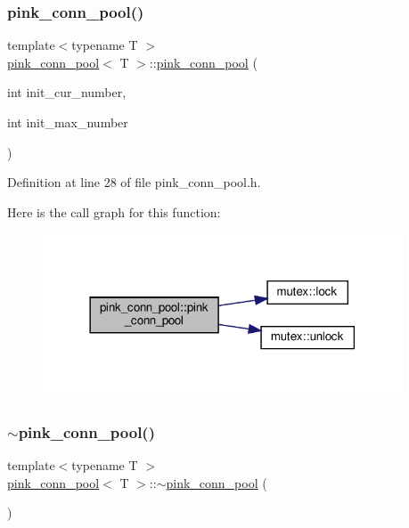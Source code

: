 \subsubsection{\texorpdfstring{pink\+\_\+conn\+\_\+pool()}{pink\_conn\_pool()}}
{\footnotesize\ttfamily template$<$typename T $>$ \\
\hyperlink{classpink__conn__pool}{pink\+\_\+conn\+\_\+pool}$<$ T $>$\+::\hyperlink{classpink__conn__pool}{pink\+\_\+conn\+\_\+pool} (\begin{DoxyParamCaption}\item[{int}]{init\+\_\+cur\+\_\+number,  }\item[{int}]{init\+\_\+max\+\_\+number }\end{DoxyParamCaption})}



Definition at line 28 of file pink\+\_\+conn\+\_\+pool.\+h.

Here is the call graph for this function\+:\nopagebreak
\begin{figure}[H]
\begin{center}
\leavevmode
\includegraphics[width=302pt]{classpink__conn__pool_a5c557c48815d595f7897f6abc8e55758_cgraph}
\end{center}
\end{figure}
\mbox{\label{classpink__conn__pool_a292bf2f0711edeee62ee787eb72b9311}} 
\subsubsection{\texorpdfstring{$\sim$pink\+\_\+conn\+\_\+pool()}{~pink\_conn\_pool()}}
{\footnotesize\ttfamily template$<$typename T $>$ \\
\hyperlink{classpink__conn__pool}{pink\+\_\+conn\+\_\+pool}$<$ T $>$\+::$\sim$\hyperlink{classpink__conn__pool}{pink\+\_\+conn\+\_\+pool} (\begin{DoxyParamCaption}{ }\end{DoxyParamCaption})}



